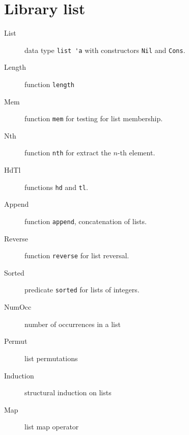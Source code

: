 \section{Library list}

\begin{description}
\item[List] data type \verb|list 'a| with constructors \verb|Nil| and
  \verb|Cons|.
\item[Length] function \verb|length|
\item[Mem] function \verb|mem| for testing for list membership.
\item[Nth] function \verb|nth| for extract the $n$-th element.
\item[HdTl] functions \verb|hd| and \verb|tl|.
\item[Append] function \verb|append|, concatenation of lists.
\item[Reverse] function \verb|reverse| for list reversal.
\item[Sorted] predicate \verb|sorted| for lists of integers.
\item[NumOcc] number of occurrences in a list
\item[Permut] list permutations
\item[Induction] structural induction on lists
\item[Map] list map operator
\end{description}





